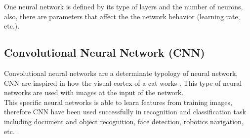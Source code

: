 One neural network is defined by its type of layers and the number of neurons, also, there are parameters that affect the the network behavior (learning rate, etc.)\cite{Lecum2}.\\



\subsection{Convolutional Neural Network (CNN)}
Convolutional neural networks are a determinate typology of neural network, CNN are inspired in how the visual cortex of a cat works \cite{Doorn}. This type of neural networks are used with images at the input of the network.\\

This specific neural networks is able to learn features from training images, therefore CNN have been used successfully in recognition and classification task including document and object recognition, face detection, robotics navigation, etc. \cite{Lecum2, Lecum3}.\\
